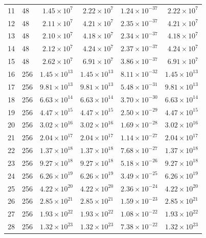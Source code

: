 \documentclass[11pt]{article}
\begin{document}
\begin{longtable}{rlrrrr}
11 & 48 & $1.45 \times 10^{7}$ & $2.22 \times 10^{7}$ & $1.24 \times 10^{-37}$ & $2.22 \times 10^{7}$ \\
12 & 48 & $2.11 \times 10^{7}$ & $4.21 \times 10^{7}$ & $2.35 \times 10^{-37}$ & $4.21 \times 10^{7}$ \\
13 & 48 & $2.10 \times 10^{7}$ & $4.18 \times 10^{7}$ & $2.34 \times 10^{-37}$ & $4.18 \times 10^{7}$ \\
14 & 48 & $2.12 \times 10^{7}$ & $4.24 \times 10^{7}$ & $2.37 \times 10^{-37}$ & $4.24 \times 10^{7}$ \\
15 & 48 & $2.62 \times 10^{7}$ & $6.91 \times 10^{7}$ & $3.86 \times 10^{-37}$ & $6.91 \times 10^{7}$ \\
\midrule
16 & 256 & $1.45 \times 10^{13}$ & $1.45 \times 10^{13}$ & $8.11 \times 10^{-32}$ & $1.45 \times 10^{13}$ \\
17 & 256 & $9.81 \times 10^{13}$ & $9.81 \times 10^{13}$ & $5.48 \times 10^{-31}$ & $9.81 \times 10^{13}$ \\
18 & 256 & $6.63 \times 10^{14}$ & $6.63 \times 10^{14}$ & $3.70 \times 10^{-30}$ & $6.63 \times 10^{14}$ \\
19 & 256 & $4.47 \times 10^{15}$ & $4.47 \times 10^{15}$ & $2.50 \times 10^{-29}$ & $4.47 \times 10^{15}$ \\
20 & 256 & $3.02 \times 10^{16}$ & $3.02 \times 10^{16}$ & $1.69 \times 10^{-28}$ & $3.02 \times 10^{16}$ \\
21 & 256 & $2.04 \times 10^{17}$ & $2.04 \times 10^{17}$ & $1.14 \times 10^{-27}$ & $2.04 \times 10^{17}$ \\
22 & 256 & $1.37 \times 10^{18}$ & $1.37 \times 10^{18}$ & $7.68 \times 10^{-27}$ & $1.37 \times 10^{18}$ \\
23 & 256 & $9.27 \times 10^{18}$ & $9.27 \times 10^{18}$ & $5.18 \times 10^{-26}$ & $9.27 \times 10^{18}$ \\
24 & 256 & $6.26 \times 10^{19}$ & $6.26 \times 10^{19}$ & $3.49 \times 10^{-25}$ & $6.26 \times 10^{19}$ \\
25 & 256 & $4.22 \times 10^{20}$ & $4.22 \times 10^{20}$ & $2.36 \times 10^{-24}$ & $4.22 \times 10^{20}$ \\
26 & 256 & $2.85 \times 10^{21}$ & $2.85 \times 10^{21}$ & $1.59 \times 10^{-23}$ & $2.85 \times 10^{21}$ \\
27 & 256 & $1.93 \times 10^{22}$ & $1.93 \times 10^{22}$ & $1.08 \times 10^{-22}$ & $1.93 \times 10^{22}$ \\
28 & 256 & $1.32 \times 10^{23}$ & $1.32 \times 10^{23}$ & $7.38 \times 10^{-22}$ & $1.32 \times 10^{23}$ \\

\end{longtable}
\end{document}

